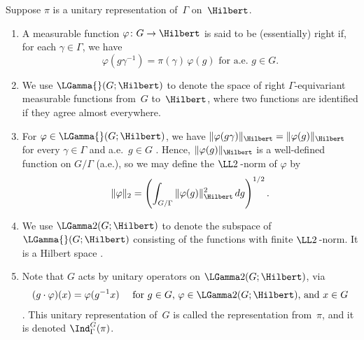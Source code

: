 \begin{defn} \label{InducedDefn}
Suppose $\pi$ is a unitary representation of~$\Gamma$ on~$\Hilbert$. 
\begin{enumerate}

\item A measurable function $\varphi \colon G \to \Hilbert$ is said to be (essentially) right  if, for each $\gamma \in \Gamma$, we have 
	$$ \text{$\varphi(g\gamma^{-1}) = \pi(\gamma) \, \varphi(g)$ for a.e.\ $g \in G$.} $$

\item We use 
	$\LGamma{}(G; \Hilbert)$ 
	to denote the space of right $\Gamma$-equivariant measurable functions from~$G$ to~$\Hilbert$, where two functions are identified if they agree almost everywhere.

\item For $\varphi \in \LGamma{}(G; \Hilbert)$, we have $\| \varphi(g \gamma) \|_\Hilbert = \| \varphi(g) \|_\Hilbert$ for every $\gamma \in \Gamma$ and a.e.\ $g \in G$ . Hence, $\|\varphi(g)\|_\Hilbert$ is a well-defined function on $G/\Gamma$ (a.e.), so we may define the $\LL2\,$-norm of $\varphi$ by
	$$ \| \varphi \|_2 = \left( \int_{G/\Gamma} \| \varphi(g) \|_\Hilbert^2 \, d g \right) ^{1/2}.$$

\item We use 
	$\LGamma2(G; \Hilbert)$ to denote the subspace of $\LGamma{}(G; \Hilbert)$ consisting of the functions with finite $\LL2\,$-norm. It is a Hilbert space .

\item \label{InducedDefn-formula}
Note that $G$ acts by unitary operators on $\LGamma2(G; \Hilbert)$, via
	\begin{align*}
	\text{$(g \cdot \varphi)(x) = \varphi( g^{-1} x)$ \quad for $g \in G$, $\varphi \in \LGamma2(G; \Hilbert)$, and $x \in G$} 
	\end{align*}
 . This unitary representation of~$G$ is called the representation  from~$\pi$, and it is denoted 
 	$\Ind_\Gamma^G(\pi)$.

 \end{enumerate}
\end{defn}

